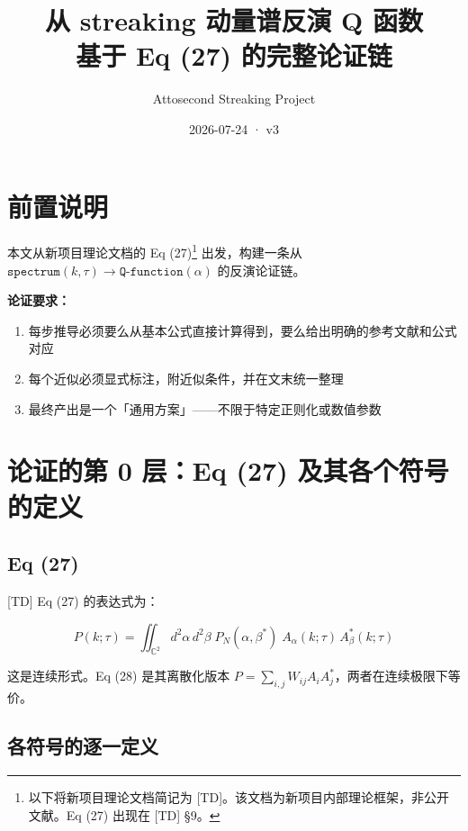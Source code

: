 \documentclass[12pt,a4paper]{ctexart}
\begin{document}
\title{从 streaking 动量谱反演 Q 函数\\[4pt]\large 基于 Eq (27) 的完整论证链}
\author{Attosecond Streaking Project}
\date{2026-07-24 · v3}

\maketitle

\tableofcontents

\section{前置说明}

本文从新项目理论文档的 Eq (27)\footnote{以下将新项目理论文档简记为 [TD]。该文档为新项目内部理论框架，非公开文献。Eq (27) 出现在 [TD] §9。} 出发，构建一条从 $\texttt{spectrum}(k,\tau) \to \texttt{Q-function}(\alpha)$ 的反演论证链。

\textbf{论证要求：}
\begin{enumerate}[nosep]
  \item[(R1)] 每步推导必须要么从基本公式直接计算得到，要么给出明确的参考文献和公式对应
  \item[(R2)] 每个近似必须显式标注，附近似条件，并在文末统一整理
  \item[(R3)] 最终产出是一个「通用方案」——不限于特定正则化或数值参数
\end{enumerate}

\section{论证的第 0 层：Eq (27) 及其各个符号的定义}

\subsection{Eq (27)}

[TD] Eq (27) 的表达式为：

\begin{equation}\label{eq:start}
P(k;\tau) = \iint_{\mathbb{C}^2} d^2\alpha\,d^2\beta\;
P_N(\alpha,\beta^*)\;
A_\alpha(k;\tau)\,
A_\beta^*(k;\tau)
\end{equation}

这是连续形式。Eq (28) 是其离散化版本 $P = \sum_{i,j} W_{ij} A_i A_j^*$，两者在连续极限下等价。

\subsection{各符号的逐一定义}
\end{document}
